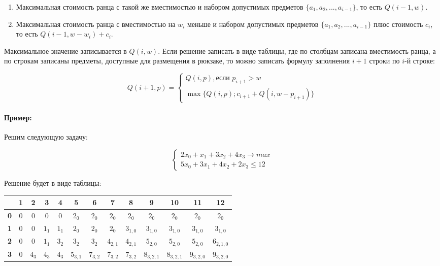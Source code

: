 \begin{enumerate}
\item{Максимальная стоимость ранца с такой же вместимостью и набором допустимых предметов $\{a_1, a_2, ..., a_{i-1}\}$, то есть $Q(i-1, w)$.}
\item{Максимальная стоимость ранца с вместимостью на $w_i$ меньше и набором допустимых предметов $\{a_1, a_2, ..., a_{i-1}\}$ плюс стоимость $c_i$, то есть $Q(i-1, w - w_i) + c_i$.}
\end{enumerate}

Максимальное значение записывается в $Q(i, w)$. Если решение записать в виде таблицы, где по столбцам записана вместимость ранца, а по строкам записаны предметы, доступные для размещения в рюкзаке, то можно записать формулу заполнения $i+1$ строки по $i$-й строке:

$$
Q(i+1, p) = \left\{
\begin{aligned}
Q(i,p), \text{если $p_{i+1}>w$} \\
\max{\{Q(i, p); c_{i+1} + Q(i, w - p_{i+1})\}}
\end{aligned}
\right.
$$

\paragraph*{Пример:}
Решим следующую задачу:

$$
\left\{
\begin{aligned}
2 x_0 + x_1 + 3 x_2 + 4 x_3 \to max \\
5 x_0 + 3 x_1 + 4 x_2 + 2 x_3 \le 12
\end{aligned}
\right.
$$

Решение будет в виде таблицы:

\begin{tabular}{|c|c|c|c|c|c|c|c|c|c|c|c|c|}
\hline
& \textbf{1} & \textbf{2} & \textbf{3} & \textbf{4} & \textbf{5} & \textbf{6} & \textbf{7} & \textbf{8} & \textbf{9} & \textbf{10} & \textbf{11} & \textbf{12} \\ \hline
\textbf{0} & 0 & 0 & 0 & 0 & $2_{0}$ & $2_{0}$ & $2_{0}$ & $2_{0}$ & $2_{0}$ & $2_{0}$ & $2_{0}$ & $2_{0}$ \\ \hline
\textbf{1} & 0 & 0 & $1_{1}$ & $1_{1}$ & $2_{0}$ & $2_{0}$ & $2_{0}$ & $3_{1,0}$ & $3_{1,0}$ & $3_{1,0}$ & $3_{1,0}$ & $3_{1,0}$ \\ \hline
\textbf{2} & 0 & 0 & $1_{1}$ & $3_2$ & $3_2$ & $3_2$ & $4_{2,1}$ & $4_{2,1}$ & $5_{2,0}$ & $5_{2,0}$ & $5_{2,0}$ & $6_{2,1,0}$ \\ \hline
\textbf{3} & 0 & $4_3$ & $4_3$ & $4_3$ & $5_{3,1}$ & $7_{3,2}$ & $7_{3,2}$ & $7_{3,2}$ & $8_{3,2,1}$ & $8_{3,2,1}$ & $9_{3,2,0}$ & $9_{3,2,0}$ \\ \hline
\end{tabular}

